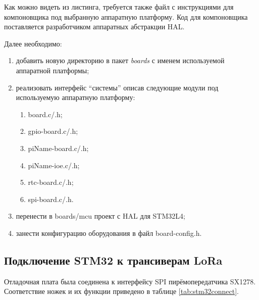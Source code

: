 Как можно видеть из листинга, требуется также файл с инструкциями для 
компоновщика под выбранную аппаратную платформу. Код для компоновщика 
поставляется разработчиком аппаратных абстракции HAL.

Далее необходимо:
\begin{enumerate}
 \item добавить новую директорию в пакет \textit{boards} с именем используемой 
аппаратной платформы;
 \item реализовать интерфейс ``системы'' описав следующие модули под 
используемую аппаратную платформу:
 \begin{enumerate}
  \item board.c/.h;
  \item gpio-board.c/.h;
  \item piName-board.c/.h;
  \item piName-ioe.c/.h;
  \item rtc-board.c/.h;
  \item spi-board.c/.h.
 \end{enumerate}
 \item перенести в boards/mcu проект с HAL для STM32L4;
 \item занести конфигурацию оборудования в файл board-config.h.
\end{enumerate}

\subsection{Подключение STM32 к трансиверам LoRa\texttrademark}

Отладочная плата была соединена к интерфейсу SPI пирёмопередатчика SX1278.
Соответствие ножек и их функции приведено в таблице \ref{tab:stm32connect}.

